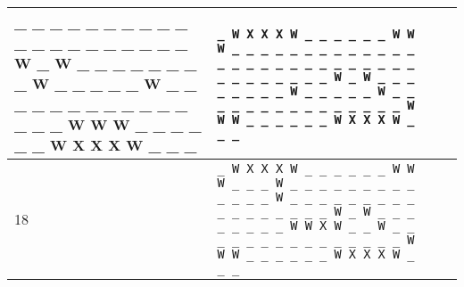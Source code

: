 \begin{longtable}{|m{}|p{}|p{}|m{}|}
{				\_  \_  \_  \_  \_  \_  \_  \_  \_  \_\newline
				\_  \_  \_  \_  \_  \_  \_  \_  \_  \_\newline
				W  \_  W  \_  \_  \_  \_  \_  \_  \_\newline
				\_  W  \_  \_  \_  \_  \_  W  \_  \_\newline
				\_  \_  \_  \_  \_  \_  \_  \_  \_  \_\newline
				\_  \_  \_  W  W  W  \_  \_  \_  \_\newline
				\_  \_  W  X  X  X  W  \_  \_  \_\newline
				}  										&	\texttt{\_  W  X  X  X  W  \_  \_  \_  \_\newline
															\_  \_  W  W  W  \_  \_  \_  \_  \_\newline
															\_  \_  \_  \_  \_  \_  \_  \_  \_  \_\newline
															\_  \_  \_  \_  \_  \_  \_  \_  \_  \_\newline
															\_  \_  \_  \_  \_  \_  \_  \_  \_  \_\newline
															W  \_  W  \_  \_  \_  \_  \_  \_  \_\newline
															\_  W  \_  \_  \_  \_  \_  W  \_  \_\newline
															\_  \_  \_  \_  \_  \_  \_  \_  \_  \_\newline
															\_  \_  \_  W  W  W  \_  \_  \_  \_\newline
															\_  \_  W  X  X  X  W  \_  \_  \_\newline
															}										& \checkmark \\ \hline
		18	&	\texttt{\_  W  X  X  X  W  \_  \_  \_  \_\newline
				\_  \_  W  W  W  \_  \_  \_  W  \_\newline
				\_  \_  \_  \_  \_  \_  \_  \_  \_  \_\newline
				\_  \_  W  \_  \_  \_  \_  \_  \_  \_\newline
				\_  \_  \_  \_  \_  \_  \_  \_  \_  \_\newline
				W  \_  W  \_  \_  \_  \_  \_  \_  \_\newline
				\_  W  W  X  W  \_  \_  W  \_  \_\newline
				\_  \_  \_  \_  \_  \_  \_  \_  \_  \_\newline
				\_  \_  \_  W  W  W  \_  \_  \_  \_\newline
				\_  \_  W  X  X  X  W  \_  \_  \_\newline
}
\end{longtable}
